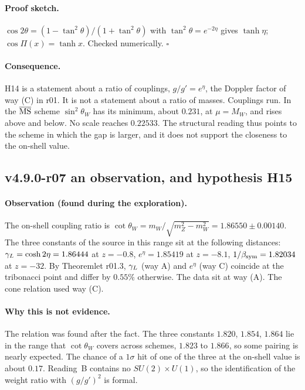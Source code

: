 \paragraph{Proof sketch.}
\(\cos2\theta=(1-\tan^2\theta)/(1+\tan^2\theta)\) with \(\tan^2\theta=e^{-2\eta}\) gives \(\tanh\eta\);
\(\cos\Pi(x)=\tanh x\).  Checked numerically.  \(\square\)

\paragraph{Consequence.}
H14 is a statement about a ratio of couplings, \(g/g'=e^{\eta}\), the Doppler factor of way (C) in r01.  It is not a
statement about a ratio of masses.  Couplings run.  In the \(\overline{\rm MS}\) scheme \(\sin^2\theta_W\) has its minimum,
about \(0.231\), at \(\mu=M_W\), and rises above and below.  No scale reaches \(0.22533\).  The structural reading thus
points to the scheme in which the gap is larger, and it does not support the closeness to the on-shell value.

\subsection*{v4.9.0-r07 an observation, and hypothesis H15}
\label{subsec:v490-r07-h15}

\paragraph{Observation (found during the exploration).}
The on-shell coupling ratio is \(\cot\theta_W=m_W/\sqrt{m_Z^2-m_W^2}=1.86550\pm0.00140\).  The three constants of the
source in this range sit at the following distances: \(\gamma_L=\cosh2\eta=1.86444\) at \(z=-0.8\), \(e^{\eta}=1.85419\) at
\(z=-8.1\), \(1/\beta_{\mathrm{sym}}=1.82034\) at \(z=-32\).  By Theoremlet r01.3, \(\gamma_L\) (way A) and \(e^\eta\) (way C) coincide at the
tribonacci point and differ by \(0.55\%\) otherwise.  The data sit at way (A).  The cone relation used way (C).

\paragraph{Why this is not evidence.}
The relation was found after the fact.  The three constants \(1.820\), \(1.854\), \(1.864\) lie in the range that
\(\cot\theta_W\) covers across schemes, \(1.823\) to \(1.866\), so some pairing is nearly expected.  The chance of a
\(1\sigma\) hit of one of the three at the on-shell value is about \(0.17\).  Reading~B contains no
\(SU(2)\times U(1)\), so the identification of the weight ratio with \((g/g')^2\) is formal.


